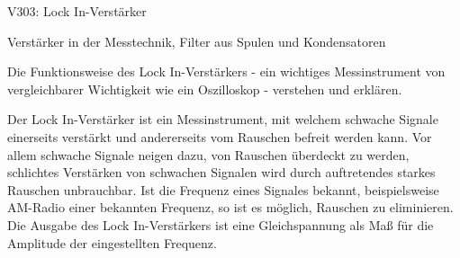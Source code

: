 


    


    \begin{Versuch}{V303: Lock In-Verstärker}
	\begin{Stichworte}
		Verstärker in der Messtechnik,
		Filter aus Spulen und Kondensatoren	
	\end{Stichworte}

	\begin{Zielsetzung}
		Die Funktionsweise des Lock In-Verstärkers - ein wichtiges Messinstrument von vergleichbarer Wichtigkeit wie ein Oszilloskop - verstehen und erklären.
	\end{Zielsetzung}

    \begin{Theorie}
    	Der Lock In-Verstärker ist ein Messinstrument, mit welchem schwache Signale einerseits verstärkt und andererseits vom  Rauschen befreit werden kann.
    	Vor allem schwache Signale neigen dazu, von Rauschen überdeckt zu werden, schlichtes Verstärken von schwachen Signalen wird durch auftretendes starkes Rauschen unbrauchbar.
    	Ist die Frequenz eines Signales bekannt, beispielsweise AM-Radio einer bekannten Frequenz, so ist es möglich, 
    	Rauschen zu eliminieren.
    	Die Ausgabe des Lock In-Verstärkers ist eine Gleichspannung als Maß für die Amplitude der eingestellten Frequenz.


\end{Theorie}
\end{Versuch}

